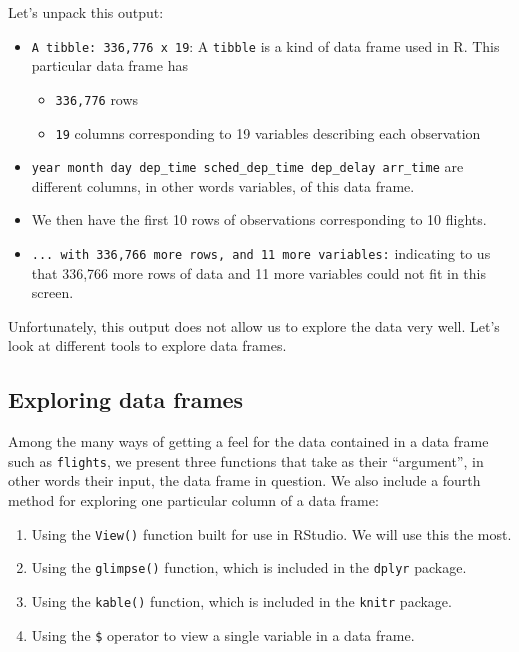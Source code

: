\documentclass[12pt, krantz2,]{krantz}
\providecommand{\tightlist}{%
  \setlength{\itemsep}{0pt}\setlength{\parskip}{0pt}}
\begin{document}
Let's unpack this output:

\begin{itemize}
\tightlist
\item
  \texttt{A\ tibble:\ 336,776\ x\ 19}: A \texttt{tibble} is a kind of data frame used in R. This particular data frame has

  \begin{itemize}
  \tightlist
  \item
    \texttt{336,776} rows
  \item
    \texttt{19} columns corresponding to 19 variables describing each observation
  \end{itemize}
\item
  \texttt{year\ month\ day\ dep\_time\ sched\_dep\_time\ dep\_delay\ arr\_time} are different columns, in other words variables, of this data frame.
\item
  We then have the first 10 rows of observations corresponding to 10 flights.
\item
  \texttt{...\ with\ 336,766\ more\ rows,\ and\ 11\ more\ variables:} indicating to us that 336,766 more rows of data and 11 more variables could not fit in this screen.
\end{itemize}

Unfortunately, this output does not allow us to explore the data very well. Let's look at different tools to explore data frames.

\hypertarget{exploredataframes}{%
\subsection{Exploring data frames}\label{exploredataframes}}

Among the many ways of getting a feel for the data contained in a data frame such as \texttt{flights}, we present three functions that take as their ``argument'', in other words their input, the data frame in question. We also include a fourth method for exploring one particular column of a data frame:

\begin{enumerate}
\def\labelenumi{\arabic{enumi}.}
\tightlist
\item
  Using the \texttt{View()} function built for use in RStudio. We will use this the most.
\item
  Using the \texttt{glimpse()} function, which is included in the \texttt{dplyr} package.
\item
  Using the \texttt{kable()} function, which is included in the \texttt{knitr} package.
\item
  Using the \texttt{\$} operator to view a single variable in a data frame.
\end{enumerate}
\end{document}
